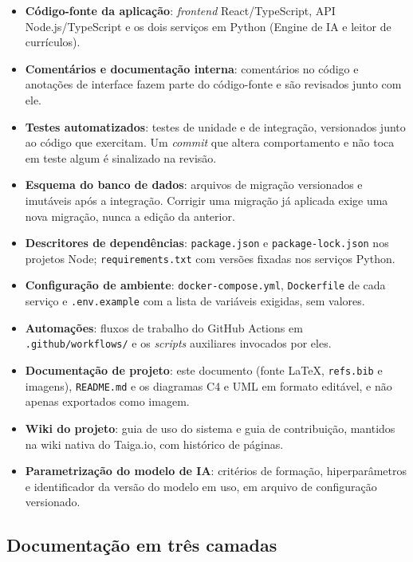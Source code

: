 \documentclass[a4paper,12pt,oneside,openany]{book}
\begin{document}
\begin{itemize}[nosep]
    \item \textbf{Código-fonte da aplicação}: \textit{frontend}
    React/TypeScript, API Node.js/TypeScript e os dois serviços em Python
    (Engine de IA e leitor de currículos).
    \item \textbf{Comentários e documentação interna}: comentários no código e
    anotações de interface fazem parte do código-fonte e são revisados junto
    com ele.
    \item \textbf{Testes automatizados}: testes de unidade e de integração,
    versionados junto ao código que exercitam. Um \textit{commit} que altera
    comportamento e não toca em teste algum é sinalizado na revisão.
    \item \textbf{Esquema do banco de dados}: arquivos de migração versionados
    e imutáveis após a integração. Corrigir uma migração já aplicada exige uma
    nova migração, nunca a edição da anterior.
    \item \textbf{Descritores de dependências}: \texttt{package.json} e
    \texttt{package-lock.json} nos projetos Node; \texttt{requirements.txt} com
    versões fixadas nos serviços Python.
    \item \textbf{Configuração de ambiente}: \texttt{docker-compose.yml},
    \texttt{Dockerfile} de cada serviço e \texttt{.env.example} com a lista de
    variáveis exigidas, sem valores.
    \item \textbf{Automações}: fluxos de trabalho do GitHub Actions em
    \texttt{.github/workflows/} e os \textit{scripts} auxiliares invocados por
    eles.
    \item \textbf{Documentação de projeto}: este documento (fonte \LaTeX,
    \texttt{refs.bib} e imagens), \texttt{README.md} e os diagramas C4 e UML em
    formato editável, e não apenas exportados como imagem.
    \item \textbf{Wiki do projeto}: guia de uso do sistema e guia de
    contribuição, mantidos na wiki nativa do Taiga.io, com histórico de
    páginas.
    \item \textbf{Parametrização do modelo de IA}: critérios de formação,
    hiperparâmetros e identificador da versão do modelo em uso, em arquivo de
    configuração versionado.
\end{itemize}

\subsection{Documentação em três camadas}
\end{document}
